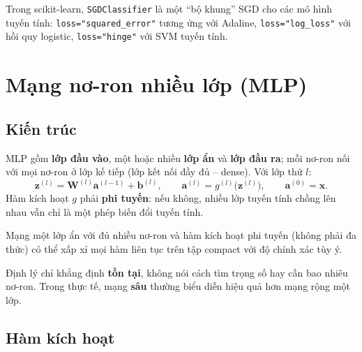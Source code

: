 Trong scikit-learn, \texttt{SGDClassifier} là một ``bộ khung'' SGD cho các mô hình tuyến tính: \texttt{loss="squared\_error"} tương ứng với Adaline, \texttt{loss="log\_loss"} với hồi quy logistic, \texttt{loss="hinge"} với SVM tuyến tính.

\section{Mạng nơ-ron nhiều lớp (MLP)}

\subsection{Kiến trúc}

MLP gồm \textbf{lớp đầu vào}, một hoặc nhiều \textbf{lớp ẩn} và \textbf{lớp đầu ra}; mỗi nơ-ron nối với mọi nơ-ron ở lớp kế tiếp (lớp kết nối đầy đủ -- dense). Với lớp thứ $l$:
\begin{equation}
    \mathbf{z}^{(l)} = \mathbf{W}^{(l)}\mathbf{a}^{(l-1)} + \mathbf{b}^{(l)}, \qquad \mathbf{a}^{(l)} = g^{(l)}\big(\mathbf{z}^{(l)}\big), \qquad \mathbf{a}^{(0)} = \mathbf{x}.
\end{equation}
Hàm kích hoạt $g$ phải \textbf{phi tuyến}: nếu không, nhiều lớp tuyến tính chồng lên nhau vẫn chỉ là một phép biến đổi tuyến tính.


\begin{theorem}
Mạng một lớp ẩn với đủ nhiều nơ-ron và hàm kích hoạt phi tuyến (không phải đa thức) có thể xấp xỉ mọi hàm liên tục trên tập compact với độ chính xác tùy ý.
\end{theorem}
Định lý chỉ khẳng định \textbf{tồn tại}, không nói cách tìm trọng số hay cần bao nhiêu nơ-ron. Trong thực tế, mạng \textbf{sâu} thường biểu diễn hiệu quả hơn mạng rộng một lớp.

\subsection{Hàm kích hoạt}

